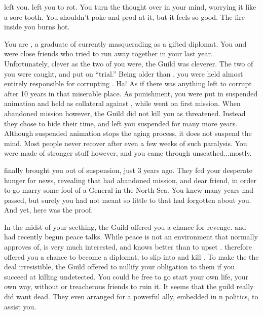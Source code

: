 \documentclass[char]{NeptuneBall}
\begin{document}
\name{\cDiplomat{}}


\cQueen{\They} left you. \cQueen{\They} left you to rot. You turn the thought over in your mind, worrying it like a sore tooth. You shouldn't poke and prod at it, but it feels so good. The fire inside you burns hot.

You are \cDiplomat{}, a graduate of \pAssassin{} currently masquerading as a gifted diplomat. You and \cQueen{} were close friends who tried to run away together in your last year. Unfortunately, clever as the two of you were, the Guild was cleverer. The two of you were caught, and put on ``trial.'' Being older than \cQueen{}, you were held almost entirely responsible for corrupting \cQueen{\them}. Ha! As if there was anything left to corrupt after 10 years in that miserable place. As punishment, you were put in suspended animation and held as collateral against \cQueen{}, while \cQueen{\they} went on \cQueen{\their} first mission. When \cQueen{} abandoned \cQueen{\their} mission however, the Guild did not kill you as threatened. Instead they chose to bide their time, and left you suspended for many more years. Although suspended animation stops the aging process, it does not suspend the mind. Most people never recover after even a few weeks of such paralysis. You were made of stronger stuff however, and you came through unscathed...mostly.

\pAssassin{} finally brought you out of suspension, just 3 years ago. They fed your desperate hunger for news, revealing that \cQueen{} had abandoned \cQueen{\their} mission, and \cQueen{\their} dear friend, in order to go marry some fool of a General in the North Sea. You knew many years had passed, but surely you had not meant so little to \cQueen{} that \cQueen{\they} had forgotten about you. And yet, here was the proof.

In the midst of your seething, the Guild offered you a chance for revenge.  \pAtlantis{} and \pPacifica{} had recently begun peace talks. While peace is not an environment that \pAssassin{} normally approves of, \cPacificanRuler{\King} \cPacificanRuler{} is very much interested, and \pAssassin{} knows better than to upset \cPacificanRuler{\them}. \cPacificanRuler{\They} therefore offered you a chance to become a diplomat, to slip into \pAtlantis{} and kill \cQueen{}. To make the the deal irresistible, the Guild offered to nullify your obligation to them if you succeed at killing \cQueen{\them} undetected. You could be free to go start your own life, your own way, without \pAssassin{} or treacherous friends to ruin it. It seems that the guild really did want \cQueen{} dead. They even arranged for a powerful ally, embedded in \pAtlantis{}n politics, to assist you.
\end{document}
